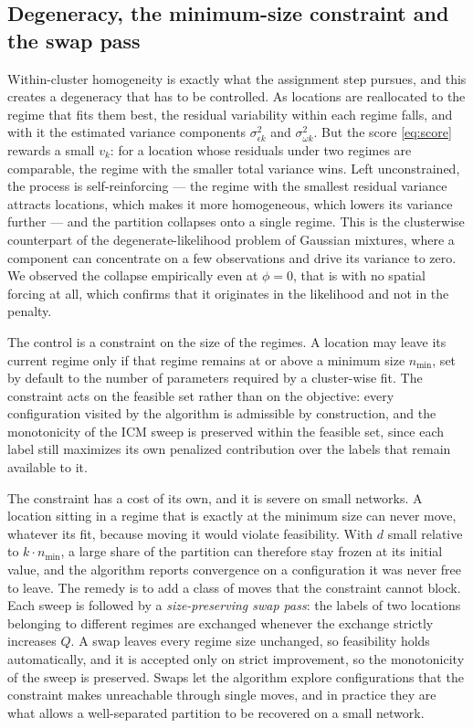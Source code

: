 \subsection{Degeneracy, the minimum-size constraint and the swap pass}\label{sec:degeneracy}

Within-cluster homogeneity is exactly what the assignment step pursues, and this creates a degeneracy that has to be controlled. As locations are reallocated to the regime that fits them best, the residual variability within each regime falls, and with it the estimated variance components $\sigma^2_{\epsilon k}$ and $\sigma^2_{\omega k}$. But the score \eqref{eq:score} rewards a small $v_k$: for a location whose residuals under two regimes are comparable, the regime with the smaller total variance wins. Left unconstrained, the process is self-reinforcing --- the regime with the smallest residual variance attracts locations, which makes it more homogeneous, which lowers its variance further --- and the partition collapses onto a single regime. This is the clusterwise counterpart of the degenerate-likelihood problem of Gaussian mixtures, where a component can concentrate on a few observations and drive its variance to zero. We observed the collapse empirically even at $\phi = 0$, that is with no spatial forcing at all, which confirms that it originates in the likelihood and not in the penalty.

The control is a constraint on the size of the regimes. A location may leave its current regime only if that regime remains at or above a minimum size $n_{\min}$, set by default to the number of parameters required by a cluster-wise fit. The constraint acts on the feasible set rather than on the objective: every configuration visited by the algorithm is admissible by construction, and the monotonicity of the ICM sweep is preserved within the feasible set, since each label still maximizes its own penalized contribution over the labels that remain available to it.

The constraint has a cost of its own, and it is severe on small networks. A location sitting in a regime that is exactly at the minimum size can never move, whatever its fit, because moving it would violate feasibility. With $d$ small relative to $k \cdot n_{\min}$, a large share of the partition can therefore stay frozen at its initial value, and the algorithm reports convergence on a configuration it was never free to leave. The remedy is to add a class of moves that the constraint cannot block. Each sweep is followed by a \emph{size-preserving swap pass}: the labels of two locations belonging to different regimes are exchanged whenever the exchange strictly increases $Q$. A swap leaves every regime size unchanged, so feasibility holds automatically, and it is accepted only on strict improvement, so the monotonicity of the sweep is preserved. Swaps let the algorithm explore configurations that the constraint makes unreachable through single moves, and in practice they are what allows a well-separated partition to be recovered on a small network.

